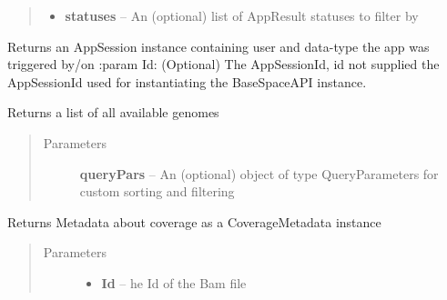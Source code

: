 \documentclass[letterpaper,10pt,english]{sphinxmanual}
\begin{document}
\begin{fulllineitems}
\begin{fulllineitems}
\begin{quote}
\begin{description}
\begin{itemize}
\item {} 
\textbf{statuses} -- An (optional) list of AppResult statuses to filter by

\end{itemize}

\end{description}\end{quote}

\end{fulllineitems}


\begin{fulllineitems}
\label{Available modules:BaseSpacePy.api.BaseSpaceAPI.BaseSpaceAPI.getAppSession}
Returns an AppSession instance containing user and data-type the app was triggered by/on 
:param Id: (Optional) The AppSessionId, id not supplied the AppSessionId used for instantiating
the BaseSpaceAPI instance.

\end{fulllineitems}


\begin{fulllineitems}
\label{Available modules:BaseSpacePy.api.BaseSpaceAPI.BaseSpaceAPI.getAvailableGenomes}
Returns a list of all available genomes
\begin{quote}\begin{description}
\item[{Parameters}] \leavevmode
\textbf{queryPars} -- An (optional) object of type QueryParameters for custom sorting and filtering

\end{description}\end{quote}

\end{fulllineitems}


\begin{fulllineitems}
\label{Available modules:BaseSpacePy.api.BaseSpaceAPI.BaseSpaceAPI.getCoverageMetaInfo}
Returns Metadata about coverage as a CoverageMetadata instance
\begin{quote}\begin{description}
\item[{Parameters}] \leavevmode\begin{itemize}
\item {} 
\textbf{Id} -- he Id of the Bam file


\end{itemize}
\end{description}
\end{quote}
\end{fulllineitems}
\end{fulllineitems}
\end{document}
